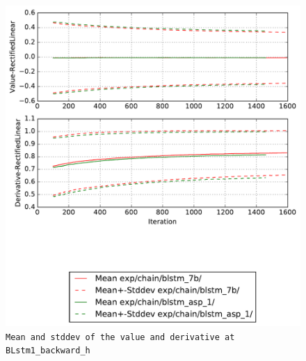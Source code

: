 \documentclass[prl,10pt,twocolumn]{revtex4}
\begin{document}
\newpage
\begin{figure}[h]
  \begin{center}
    \caption{\texttt{Mean and stddev of the value and derivative at BLstm1\_backward\_h}}
    \includegraphics[width=\textwidth]{exp/chain/blstm_7b/report/nonlinstats_BLstm1_backward_h.pdf}
  \end{center}
\end{figure}
\clearpage
\end{document}

